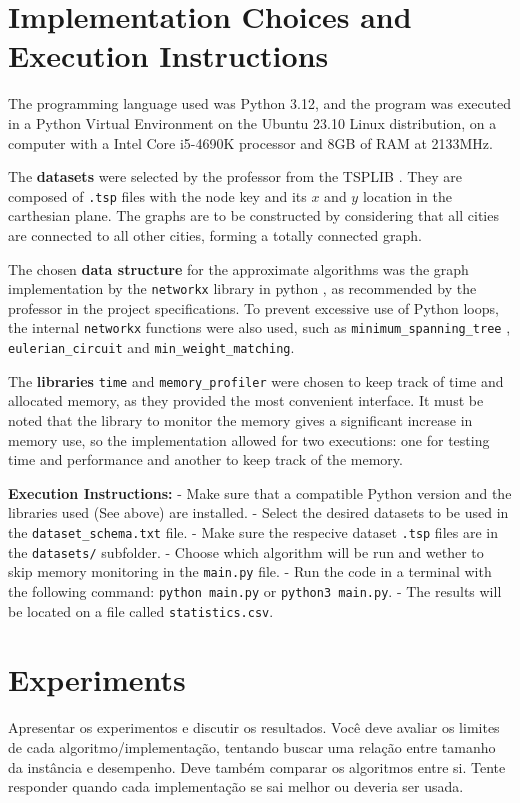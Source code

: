 \documentclass[12pt]{article}
\begin{document}
\section{Implementation Choices and Execution Instructions} \label{sec:implementation}

The programming language used was Python 3.12, and the program was executed 
in a Python Virtual Environment on the Ubuntu 23.10 Linux distribution, on a computer with a 
Intel Core i5-4690K processor and 8GB of RAM at 2133MHz.

The \textbf{datasets} were selected by the professor from the TSPLIB \cite{datasets_lib}. They are 
composed of \texttt{.tsp} files with the node key and its $x$ and $y$ location in the carthesian plane. 
The graphs are to be constructed by considering that all cities are connected to all other cities, forming 
a totally connected graph.

The chosen \textbf{data structure} for the approximate algorithms was the graph implementation 
by the \texttt{networkx} library in python \cite{networkx_docs}, as recommended by 
the professor in the project specifications. To prevent excessive use of Python loops, 
the internal \texttt{networkx} functions were also used, such as \texttt{minimum\_spanning\_tree} , 
\texttt{eulerian\_circuit} and \texttt{min\_weight\_matching}.

The \textbf{libraries} \texttt{time} and \texttt{memory\_profiler} were chosen to keep track of time 
and allocated memory, as they provided the most convenient interface. It must be noted that the library 
to monitor the memory gives a significant increase in memory use, so the implementation allowed for 
two executions: one for testing time and performance and another to keep track of the memory.

\textbf{Execution Instructions:}
- Make sure that a compatible Python version and the libraries used (See above) are installed.
- Select the desired datasets to be used in the \texttt{dataset_schema.txt} file.
- Make sure the respecive dataset \texttt{.tsp} files are in the \texttt{datasets/} subfolder.
- Choose which algorithm will be run and wether to skip memory monitoring in the \texttt{main.py} file.
- Run the code in a terminal with the following command: \texttt{python main.py} or \texttt{python3 main.py}.
- The results will be located on a file called \texttt{statistics.csv}.

\section{Experiments} \label{sec:experiments}
    Apresentar os experimentos e discutir os resultados. Você deve avaliar os
    limites de cada algoritmo/implementação, tentando buscar uma relação entre
    tamanho da instância e desempenho. Deve também comparar os algoritmos
    entre si. Tente responder quando cada implementação se sai melhor ou
    deveria ser usada.
\end{document}
